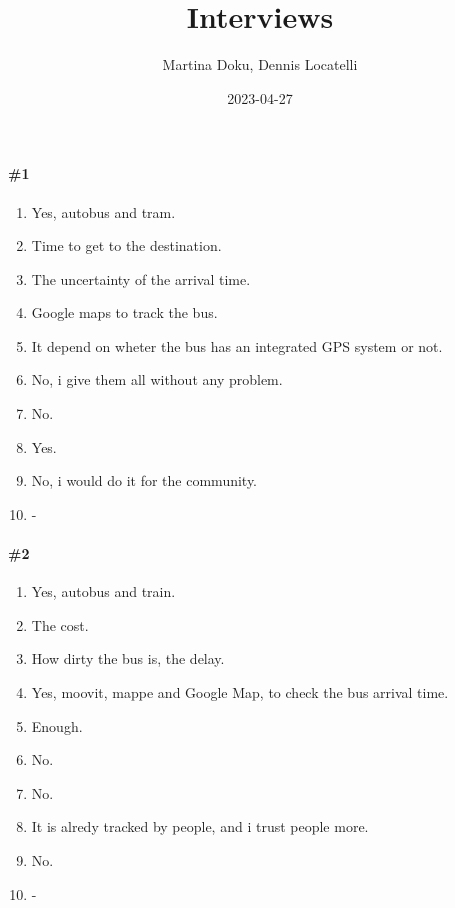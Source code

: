 \documentclass[a4paper, 10pt]{article}
\title{Interviews}
\author{Martina Doku, Dennis Locatelli}
\date{2023-04-27}
\begin{document}
\maketitle
\paragraph*{\#1}
\begin{enumerate}
    \item Yes, autobus and tram.
    \item Time to get to the destination.
    \item The uncertainty of the arrival time.
    \item Google maps to track the bus.
    \item It depend on wheter the bus has an integrated GPS system or not.
    \item No, i give them all without any problem.
    \item No.
    \item Yes.
    \item No, i would do it for the community.
    \item -
\end{enumerate}

\paragraph*{\#2}
\begin{enumerate}
    \item Yes, autobus and train.
    \item The cost.
    \item How dirty the bus is, the delay.
    \item Yes, moovit, mappe and Google Map, to check the bus arrival time.
    \item Enough.
    \item No.
    \item No.
    \item It is alredy tracked by people, and i trust people more.
    \item No.
    \item -
\end{enumerate}
\end{document}
